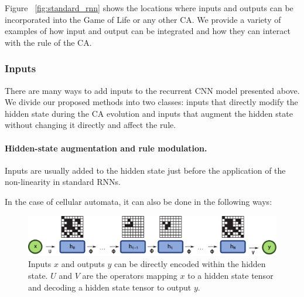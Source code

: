 Figure ~\ref{fig:standard_rnn} shows the locations where inputs and 
outputs can be incorporated into the Game of Life or any other \ac{CA}. 
We provide a variety of examples of how input and output can be integrated 
and how they can interact with the rule of the \ac{CA}.


\subsubsection{Inputs}
There are many ways to add inputs to the recurrent \ac{CNN} model presented
above. We divide our proposed methods into two classes: inputs that directly
modify the hidden state during the CA evolution and inputs that augment the
hidden state without changing it directly and affect the rule.


\paragraph{Hidden-state augmentation and rule modulation.}
Inputs are usually added to the hidden state just before the application of the
non-linearity in standard RNNs.

In the case of cellular automata, it can also be done in the following ways:

\begin{figure}[ht]
  \centering
  \includegraphics[width=.9\linewidth]{figures/encode_decode.pdf}
  \caption{\label{fig:encode_decode} Inputs $x$ and outputs $y$ can be directly
    encoded within the hidden state. $U$ and $V$ are the operators mapping $x$ 
    to a hidden state tensor and decoding a hidden state tensor to output $y$.}
\end{figure}

